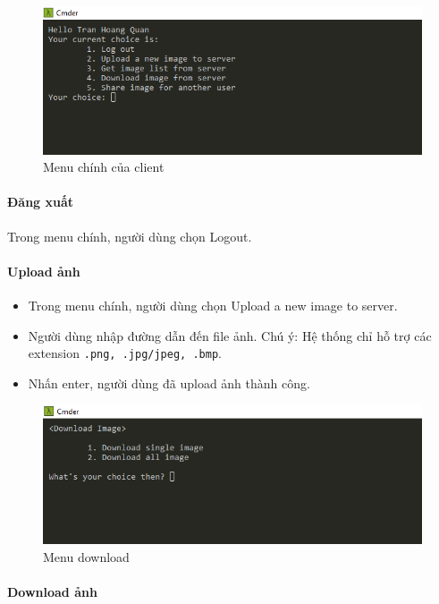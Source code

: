 \documentclass[12pt]{article}
\begin{document}
\begin{figure}[H]
\centering
\includegraphics[]{main-menu.PNG}
\caption{Menu chính của client}
\end{figure}

\paragraph{Đăng xuất}

Trong menu chính, người dùng chọn Logout.

\paragraph{Upload ảnh}
\begin{itemize}
    \item Trong menu chính, người dùng chọn Upload a new image to server.
    \item Người dùng nhập đường dẫn đến file ảnh. Chú ý: Hệ thống chỉ hỗ trợ các extension \texttt{.png, .jpg/jpeg, .bmp}.
    \item Nhấn enter, người dùng đã upload ảnh thành công.
\end{itemize}

\begin{figure}[H]
\centering
\includegraphics[]{download-menu.PNG}
\caption{Menu download}
\end{figure}

\paragraph{Download ảnh}
\end{document}
